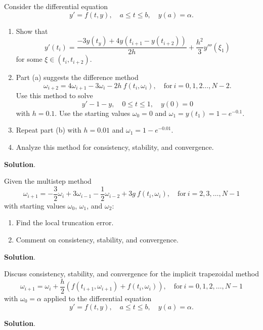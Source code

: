 \documentclass[11pt]{article}
\theoremstyle{break}
\numberwithin{equation}{theorem}
\begin{document}
\newpage
\begin{problem}\label{problem 16} %
    Consider the differential equation $$y'=f(t, y), \quad a\leq t\leq b, \quad y(a)=\alpha.$$
    \begin{enumerate}
        \item Show that $$y'(t_i)=\dfrac{-3y(t_y)+4y(t_{i+1}-y(t_{i+2}))}{2h}+\dfrac{h^2}{3}y'''(\xi_1)$$ for some $\xi\in(t_i, t_{i+2})$.
        \item Part (a) suggests the difference method $$\omega_{i+2}=4\omega_{i+1}-3\omega_{i}-2h\:f(t_i, \omega_i), \quad\text{for}\ i=0,1,2\dots, N-2.$$ Use this method to solve $$y'-1-y, \quad 0\leq t\leq 1, \quad y(0)=0$$ with $h=0.1$. Use the starting values $\omega_0=0$ and $\omega_1=y(t_1)=1-e^{-0.1}$.
        \item Repeat part (b) with $h=0.01$ and $\omega_1=1-e^{-0.01}$.
        \item Analyze this method for consistency, stability, and convergence.
    \end{enumerate}
\end{problem}
\textbf{Solution}.


\newpage
\begin{problem}\label{problem 17} %
    Given the multistep method $$\omega_{i+1}=-\dfrac{3}{2}\omega_i+3\omega_{i-1}-\dfrac{1}{2}\omega_{i-2}+3g\:f(t_i, \omega_i), \quad \text{for}\ i=2,3,\dots, N-1$$ with starting values $\omega_0$, $\omega_1$, and $\omega_2$:
    \begin{enumerate}
        \item Find the local truncation error.
        \item Comment on consistency, stability, and convergence.
    \end{enumerate}
\end{problem}
\textbf{Solution}.


\newpage
\begin{problem}\label{problem 18} %
    Discuss consistency, stability, and convergence for the implicit trapezoidal method $$\omega_{i+1}=\omega_i+\dfrac{h}{2}\left(f(t_{i+1}, \omega_{i+1})+f(t_i, \omega_i)\right),\quad \text{for}\ i=0,1,2,\dots, N-1$$ with $\omega_0=\alpha$ applied to the differential equation $$y'=f(t, y), \quad a\leq t\leq b, \quad y(a)=\alpha.$$
\end{problem}
\textbf{Solution}.
\end{document}
